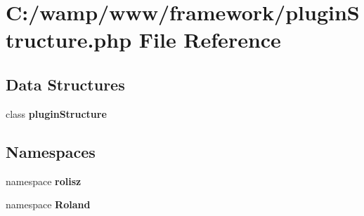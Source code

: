 \section{C:/wamp/www/framework/pluginStructure.php File Reference}
\label{plugin_structure_8php}
\subsection*{Data Structures}
\begin{DoxyCompactItemize}
\item 
class {\bf pluginStructure}
\end{DoxyCompactItemize}
\subsection*{Namespaces}
\begin{DoxyCompactItemize}
\item 
namespace {\bf rolisz}
\item 
namespace {\bf Roland}
\end{DoxyCompactItemize}
